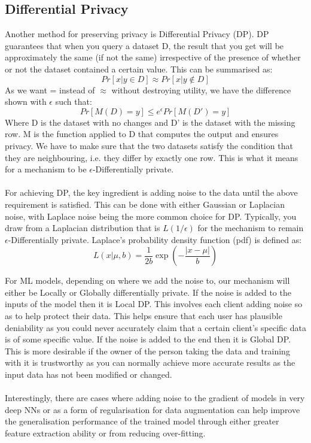 \subsection{Differential Privacy}
Another method for preserving privacy is Differential Privacy (DP). DP guarantees that when you query a dataset D, the result that you get will be approximately the same (if not the same) irrespective of the presence of whether or not the dataset contained a certain value. This can be summarised as:
\begin{equation}
    Pr[x | y \in D] \approx Pr[x | y \notin D]
\end{equation}
As we want = instead of $\approx$ without destroying utility, we have the difference shown with $\epsilon$ such that:
\begin{equation}
    Pr[M(D) = y] \leq e^\epsilon Pr[M(D') = y]
\end{equation}
Where D is the dataset with no changes and D' is the dataset with the missing row. M is the function applied to D that computes the output and ensures privacy. We have to make sure that the two datasets satisfy the condition that they are neighbouring, i.e. they differ by exactly one row. This is what it means for a mechanism to be $\epsilon$-Differentially private. \\ \\
For achieving DP, the key ingredient is adding noise to the data until the above requirement is satisfied. This can be done with either Gaussian or Laplacian noise, with Laplace noise being the more common choice for DP. Typically, you draw from a Laplacian distribution that is $L(1/\epsilon)$ for the mechanism to remain $\epsilon$-Differentially private. Laplace's probability density function (pdf) is defined as:
\begin{equation}
    L(x|\mu,b) = \dfrac{1}{2b} \exp \left( -\dfrac{|x - \mu|}{b}\right)
\end{equation}

For ML models, depending on where we add the noise to, our mechanism will either be Locally or Globally differentially private. If the noise is added to the inputs of the model then it is Local DP. This involves each client adding noise so as to help protect their data. This helps ensure that each user has plausible deniability as you could never accurately claim that a certain client's specific data is of some specific value. If the noise is added to the end then it is Global DP. This is more desirable if the owner of the person taking the data and training with it is trustworthy as you can normally achieve more accurate results \cite{global_dp} as the input data has not been modified or changed. \\ \\
Interestingly, there are cases where adding noise to the gradient of models in very deep NNs \cite{dnn_noise} or as a form of regularisation for data augmentation \cite{robust_corrupt_noise} can help improve the generalisation performance of the trained model through either greater feature extraction ability or from reducing over-fitting.